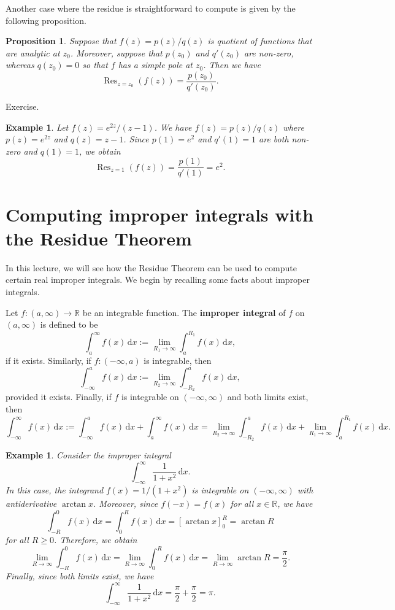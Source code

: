 \documentclass[10pt]{article}
\makeatletter
\newcommand{\R}{\mathbb{R}}
\newcommand{\dd}{\,\mathrm{d}}
\DeclareMathOperator{\Res}{Res}
\theoremstyle{newstyle}
\newtheorem{prop}[thm]{Proposition}
\newtheorem{exmp}[thm]{Example}
\newenvironment{pf}[1][\proofname]{\par
  \pushQED{\qed}%
  \normalfont \topsep0\p@\relax
  \trivlist
  \item[\hskip\labelsep\scshape
  #1\@addpunct{.}]\ignorespaces
}{%
  \popQED\endtrivlist\@endpefalse
}
\makeatother
\begin{document}
Another case where the residue is straightforward to compute is given by the following proposition. 

\begin{prop}
Suppose that $f(z) = p(z)/q(z)$ is quotient of functions that are analytic at $z_0$. 
Moreover, suppose that $p(z_0)$ and $q'(z_0)$ are non-zero, whereas $q(z_0) = 0$ so that 
$f$ has a simple pole at $z_0$. Then we have 
\[ \Res_{z=z_0}(f(z)) = \frac{p(z_0)}{q'(z_0)}. \]
\end{prop}
\begin{pf}
Exercise.
\end{pf}

\begin{exmp}
Let $f(z) = e^{2z}/(z-1)$. We have $f(z) = p(z)/q(z)$ where $p(z) = e^{2z}$ and $q(z) = z-1$. 
Since $p(1) = e^2$ and $q'(1) = 1$ are both non-zero and $q(1) = 1$, we obtain 
\[ \Res_{z=1}(f(z)) = \frac{p(1)}{q'(1)} = e^2. \]
\end{exmp}

\newpage 
\section{Computing improper integrals with the Residue Theorem}

In this lecture, we will see how the Residue Theorem can be used to compute certain 
real improper integrals. We begin by recalling some facts about improper integrals. 

Let $f : (a, \infty) \to \R$ be an integrable function. The {\bf improper integral} of 
$f$ on $(a, \infty)$ is defined to be 
\[ \int_a^\infty f(x)\dd x := \lim_{R_1\to\infty} \int_a^{R_1} f(x)\dd x, \]
if it exists. Similarly, if $f : (-\infty, a)$ is integrable, then 
\[ \int_{-\infty}^a f(x)\dd x := \lim_{R_2\to\infty} \int_{-R_2}^a f(x)\dd x, \]
provided it exists. Finally, if $f$ is integrable on $(-\infty, \infty)$ and both 
limits exist, then 
\[ \int_{-\infty}^\infty f(x)\dd x := \int_{-\infty}^a f(x)\dd x + \int_a^\infty f(x)\dd x 
= \lim_{R_2\to\infty} \int_{-R_2}^a f(x)\dd x + \lim_{R_1\to\infty} \int_a^{R_1} f(x)\dd x. \]

\begin{exmp}
Consider the improper integral 
\[ \int_{-\infty}^\infty \frac{1}{1+x^2}\dd x. \]
In this case, the integrand $f(x) = 1/(1+x^2)$ is integrable on $(-\infty, \infty)$ with 
antiderivative $\arctan x$. Moreover, since $f(-x) = f(x)$ for all $x \in \R$, we have 
\[ \int_{-R}^0 f(x)\dd x = \int_0^R f(x)\dd x = [\arctan x]_0^R = \arctan R \] 
for all $R \geq 0$. Therefore, we obtain 
\[ \lim_{R\to\infty} \int_{-R}^0 f(x)\dd x = \lim_{R\to\infty} \int_0^R f(x)\dd x = 
\lim_{R\to\infty} \arctan R = \frac\pi2. \]
Finally, since both limits exist, we have 
\[ \int_{-\infty}^\infty \frac{1}{1+x^2}\dd x = \frac\pi2 + \frac\pi2 = \pi. \]
\end{exmp}
\end{document}
